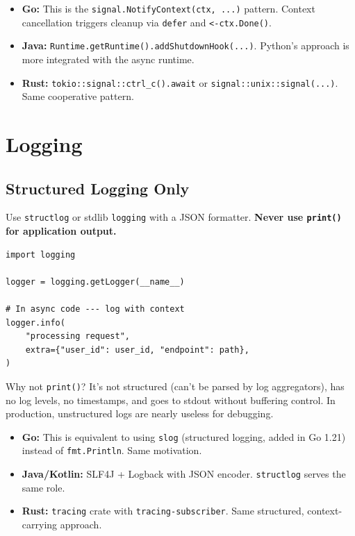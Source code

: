 \documentclass[11pt,a4paper,oneside]{book}
\newcommand{\py}[1]{\texttt{\color{pyblue}#1}}
\newcommand{\gocode}[1]{\texttt{\color{goblue}#1}}
\newcommand{\rustcode}[1]{\texttt{\color{BrickRed}#1}}
\newcommand{\javacode}[1]{\texttt{\color{javaorange!80!black}#1}}
\begin{document}
\begin{analogybox}
\begin{itemize}
    \item \textcolor{goblue}{\textbf{Go:}} This is the
          \gocode{signal.NotifyContext(ctx, ...)} pattern. Context cancellation triggers cleanup
          via \texttt{defer} and \texttt{<-ctx.Done()}.
    \item \textcolor{javaorange}{\textbf{Java:}} \javacode{Runtime.getRuntime().addShutdownHook(...)}.
          Python's approach is more integrated with the async runtime.
    \item \textcolor{BrickRed}{\textbf{Rust:}} \rustcode{tokio::signal::ctrl\_c().await}
          or \texttt{signal::unix::signal(...)}. Same cooperative pattern.
\end{itemize}
\end{analogybox}

\chapter{Logging}

\section{Structured Logging Only}

Use \py{structlog} or stdlib \py{logging} with a JSON formatter. \textbf{Never use \py{print()}
for application output.}

\begin{lstlisting}[style=python]
import logging

logger = logging.getLogger(__name__)

# In async code --- log with context
logger.info(
    "processing request",
    extra={"user_id": user_id, "endpoint": path},
)
\end{lstlisting}

\begin{warningbox}
Why not \py{print()}? It's not structured (can't be parsed by log aggregators), has no log levels,
no timestamps, and goes to stdout without buffering control. In production, unstructured logs
are nearly useless for debugging.
\end{warningbox}

\begin{analogybox}
\begin{itemize}
    \item \textcolor{goblue}{\textbf{Go:}} This is equivalent to using \texttt{slog} (structured
          logging, added in Go 1.21) instead of \texttt{fmt.Println}. Same motivation.
    \item \textcolor{javaorange}{\textbf{Java/Kotlin:}} SLF4J + Logback with JSON encoder.
          \py{structlog} serves the same role.
    \item \textcolor{BrickRed}{\textbf{Rust:}} \texttt{tracing} crate with \texttt{tracing-subscriber}.
          Same structured, context-carrying approach.
\end{itemize}
\end{analogybox}
\end{document}
